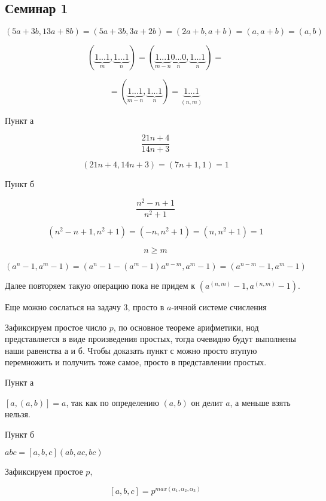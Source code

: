 \subsection*{Семинар 1}



$$(5a + 3b, 13a + 8b) = (5a + 3b, 3a + 2b) = (2a + b, a + b) = (a, a + b) = (a, b)$$


$$(\underbrace{1...1}_{m}, \underbrace{1...1}_{n}) = (\underbrace{1...1}_{m - n} \underbrace{0...0}_{n}, \underbrace{1...1}_{n}) =$$

$$= (\underbrace{1...1}_{m - n}, \underbrace{1...1}_{n}) = \underbrace{1...1}_{(n, m)}$$


Пункт а

$$\frac{21n + 4}{14n + 3}$$

$$(21n + 4, 14n + 3) = (7n + 1, 1) = 1$$

Пункт б

$$\frac{n^2 - n + 1}{n^2 + 1}$$

$$(n^2 - n + 1, n^2 + 1) = (-n, n^2 + 1) = (n, n^2 + 1) = 1$$


$$n \geq m$$

$$(a^n - 1, a^m - 1) = (a^n - 1 - (a^m - 1)a^{n - m}, a^m - 1) = (a^{n - m} - 1, a^m - 1)$$

Далее повторяем такую операцию пока не придем к $(a^{(n, m)} - 1, a^{(n, m)} - 1)$.

Еще можно сослаться на задачу 3, просто в $a$-ичной системе счисления


Зафиксируем простое число $p$, по основное теореме арифметики, нод представляется в виде произведения простых, тогда очевидно будут выполнены
наши равенства а и б. Чтобы доказать пункт с можно просто втупую перемножить и получить тоже самое, просто в представлении простых.


Пункт а

$[a, (a, b)] = a$, так как по определению $(a, b)$ он делит $a$, а меньше взять нельзя.

Пункт б

$abc = [a, b, c](ab, ac, bc)$

Зафиксируем простое $p$,

$$[a, b, c] = p^{max(\alpha_1, \alpha_2, \alpha_3)}$$

